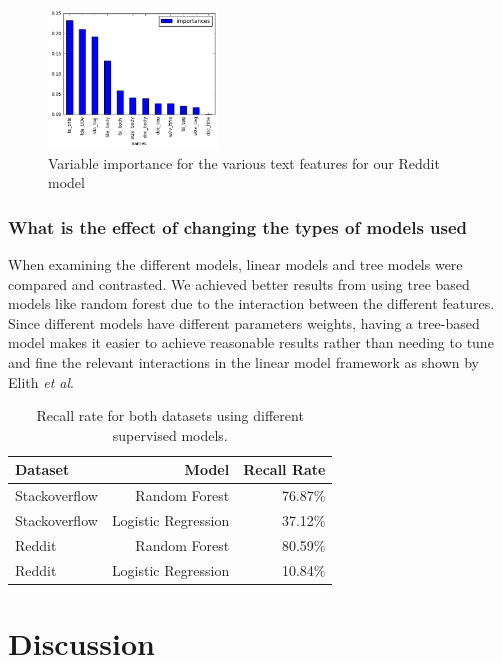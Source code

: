 \documentclass[journal,12pt,onecolumn,draftclsnofoot,]{IEEEtran}
\begin{document}
\begin{figure}[ht]
\centering
\caption{Variable importance for the various text features for our Reddit model}
\includegraphics[width=0.4\textwidth]{reddit_varimp.png}
\end{figure}



\subsubsection{What is the effect of changing the types of models used}

When examining the different models, linear models and tree models were compared and contrasted. We achieved better results from using tree based models like random forest due to the interaction between the different features. Since different models have different parameters weights, having a tree-based model makes it easier to achieve reasonable results rather than needing to tune and fine the relevant interactions in the linear model framework as shown by Elith \emph{et al}\cite{gbminteraction}. 

\begin{table}[h!]
\centering
\caption{Recall rate for both datasets using different supervised models.}
 \begin{tabular}{|l r r|} 
 \hline
 Dataset & Model & Recall Rate  \\ [0.5ex] 
 \hline\hline
 Stackoverflow & Random Forest & 76.87\%  \\
 Stackoverflow & Logistic Regression & 37.12\%  \\
 \hline
  Reddit & Random Forest & 80.59\%  \\
  Reddit & Logistic Regression & 10.84\%  \\
 \hline
\end{tabular}
\end{table}

\section{Discussion}
\end{document}
